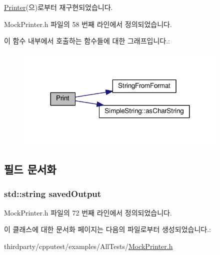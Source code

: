 \hyperlink{class_printer_a58eb98db9d4e854955eafe15976c6472}{Printer}(으)로부터 재구현되었습니다.



Mock\+Printer.\+h 파일의 58 번째 라인에서 정의되었습니다.




이 함수 내부에서 호출하는 함수들에 대한 그래프입니다.\+:
\nopagebreak
\begin{figure}[H]
\begin{center}
\leavevmode
\includegraphics[width=288pt]{class_mock_printer_a5314eb94033e6305bb593e3927df427a_cgraph}
\end{center}
\end{figure}




\subsection{필드 문서화}
\subsubsection[{\texorpdfstring{saved\+Output}{savedOutput}}]{\setlength{\rightskip}{0pt plus 5cm}std\+::string saved\+Output\hspace{0.3cm}{\ttfamily [private]}}\hypertarget{class_mock_printer_ac07d63b41e380ff0bac6f0a58f49cda0}{}\label{class_mock_printer_ac07d63b41e380ff0bac6f0a58f49cda0}


Mock\+Printer.\+h 파일의 72 번째 라인에서 정의되었습니다.



이 클래스에 대한 문서화 페이지는 다음의 파일로부터 생성되었습니다.\+:\begin{DoxyCompactItemize}
\item 
thirdparty/cpputest/examples/\+All\+Tests/\hyperlink{_mock_printer_8h}{Mock\+Printer.\+h}\end{DoxyCompactItemize}
